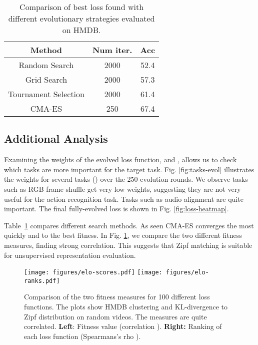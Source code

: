\documentclass[10pt,twocolumn,letterpaper]{article}
\begin{document}
\begin{table}
\vspace{-4mm}
    \centering
    \small
    \begin{tabular}{c|cc}
    \toprule
        Method & Num iter. & Acc \\
        \midrule
        Random Search & 2000 & 52.4 \\
        Grid Search & 2000 & 57.3 \\
        Tournament Selection & 2000 & 61.4 \\
        CMA-ES & 250 & 67.4 \\
        \bottomrule
    \end{tabular}
    \caption{Comparison of best loss found with different evolutionary strategies evaluated on HMDB.}
    \label{tab:es}
\end{table}





\vspace{-2mm}
\subsection{Additional Analysis}

Examining the weights of the evolved loss function,  and , allows us to check which tasks are more important for the target task. Fig. \ref{fig:tasks-evol} illustrates the weights for several tasks () over the 250 evolution rounds. We observe tasks such as RGB frame shuffle get very low weights, suggesting they are not very useful for the action recognition task. Tasks such as audio alignment are quite important. 
 The final fully-evolved loss is shown in Fig. \ref{fig:loss-heatmap}.





Table~\ref{tab:es} compares different search methods. As seen CMA-ES converges the most quickly and to the best fitness. In Fig. \ref{fig:hmdb-vs-kl}, we compare the two different fitness measures, finding strong correlation. This suggests that Zipf matching is suitable for unsupervised representation evaluation.


\begin{figure}
    \centering
    \vspace{-3mm}
    \texttt{[image: figures/elo-scores.pdf]}
    \texttt{[image: figures/elo-ranks.pdf]}
    \caption{Comparison of the two fitness measures for 100 different loss functions. The plots show HMDB clustering and KL-divergence to Zipf distribution on random videos. The measures are quite correlated. \textbf{Left}: Fitness value (correlation ). \textbf{Right:} Ranking of each loss function (Spearmans's rho ).}
    \label{fig:hmdb-vs-kl}
\end{figure}
\end{document}
